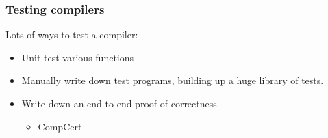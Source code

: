 \documentclass{beamer}
\begin{document}

\begin{frame}
  \frametitle{Testing compilers}

  Lots of ways to test a compiler:

  \begin{itemize}
  \item Unit test various functions
  \item Manually write down test programs, building up a huge library
    of tests.
  \item Write down an end-to-end proof of correctness
    \begin{itemize}
    \item CompCert
    \end{itemize}
  \end{itemize}


\end{frame}
\end{document}

